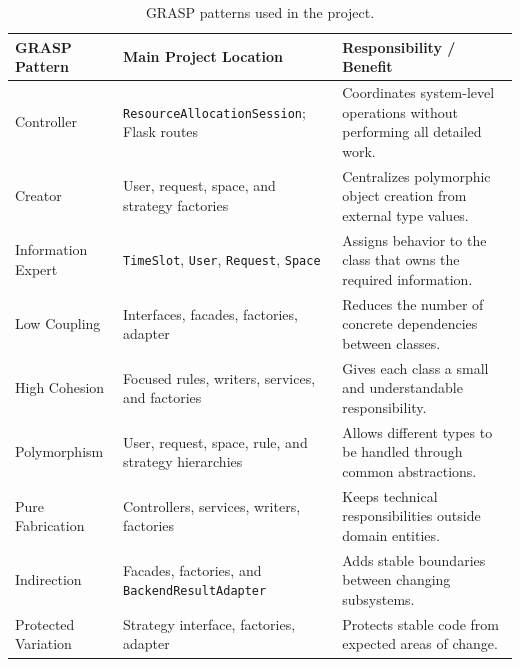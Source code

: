 \documentclass[12pt,a4paper]{article}
\begin{document}
\begin{table}[H]
    \centering
    \small
    \caption{GRASP patterns used in the project.}
    \begin{tabularx}{\textwidth}{L{3.1cm}L{4.8cm}Y}
        \toprule
        \textbf{GRASP Pattern}
        & \textbf{Main Project Location}
        & \textbf{Responsibility / Benefit} \\
        \midrule

        Controller
        & \texttt{ResourceAllocationSession}; Flask routes
        & Coordinates system-level operations without performing all detailed work. \\

        Creator
        & User, request, space, and strategy factories
        & Centralizes polymorphic object creation from external type values. \\

        Information Expert
        & \texttt{TimeSlot}, \texttt{User}, \texttt{Request}, \texttt{Space}
        & Assigns behavior to the class that owns the required information. \\

        Low Coupling
        & Interfaces, facades, factories, adapter
        & Reduces the number of concrete dependencies between classes. \\

        High Cohesion
        & Focused rules, writers, services, and factories
        & Gives each class a small and understandable responsibility. \\

        Polymorphism
        & User, request, space, rule, and strategy hierarchies
        & Allows different types to be handled through common abstractions. \\

        Pure Fabrication
        & Controllers, services, writers, factories
        & Keeps technical responsibilities outside domain entities. \\

        Indirection
        & Facades, factories, and \texttt{BackendResultAdapter}
        & Adds stable boundaries between changing subsystems. \\

        Protected Variation
        & Strategy interface, factories, adapter
        & Protects stable code from expected areas of change. \\

        \bottomrule
    \end{tabularx}
\end{table}
\end{document}
